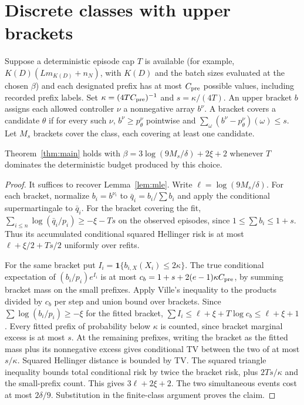\section{Discrete classes with upper brackets}\label{app:bracket}
Suppose a deterministic episode cap $T$ is available (for example, $K(D)(Lm_{K(D)}+n_N)$, with $K(D)$ and the batch sizes evaluated at the chosen $\beta$) and each designated prefix has at most $C_{\rm pre}$ possible values, including recorded prefix labels. Set $\kappa=(4TC_{\rm pre})^{-1}$ and $s=\kappa/(4T)$. An upper bracket $b$ assigns each allowed controller $\nu$ a nonnegative array $b^\nu$. A bracket covers a candidate $\theta$ if for every such $\nu$, $b^\nu\ge p_\theta^\nu$ pointwise and $\sum_\omega(b^\nu-p_\theta^\nu)(\omega)\le s$. Let $M_s$ brackets cover the class, each covering at least one candidate.

\begin{corollary}
Theorem~\ref{thm:main} holds with $\beta=3\log(9M_s/\delta)+2\xi+2$ whenever $T$ dominates the deterministic budget produced by this choice.
\end{corollary}
\begin{proof}
It suffices to recover Lemma~\ref{lem:mle}. Write $\ell=\log(9M_s/\delta)$. For each bracket, normalize $b_i=b^{\nu_i}$ to $\bar q_i=b_i/\sum b_i$ and apply the conditional supermartingale to $\bar q_i$. For the bracket covering the fit, $\sum_{i\le n}\log(\bar q_i/p_i)\ge-\xi-Ts$ on the observed episodes, since $1\le\sum b_i\le1+s$. Thus its accumulated conditional squared Hellinger risk is at most $\ell+\xi/2+Ts/2$ uniformly over refits.

For the same bracket put $I_i=\mathbf1\{b_{i,X}(X_i)\le2\kappa\}$. The true conditional expectation of $(b_i/p_i)e^{I_i}$ is at most $c_b=1+s+2(e-1)\kappa C_{\rm pre}$, by summing bracket mass on the small prefixes. Apply Ville's inequality to the products divided by $c_b$ per step and union bound over brackets. Since $\sum\log(b_i/p_i)\ge-\xi$ for the fitted bracket, $\sum I_i\le\ell+\xi+T\log c_b\le\ell+\xi+1$. Every fitted prefix of probability below $\kappa$ is counted, since bracket marginal excess is at most $s$. At the remaining prefixes, writing the bracket as the fitted mass plus its nonnegative excess gives conditional TV between the two of at most $s/\kappa$. Squared Hellinger distance is bounded by TV. The squared triangle inequality bounds total conditional risk by twice the bracket risk, plus $2Ts/\kappa$ and the small-prefix count. This gives $3\ell+2\xi+2$. The two simultaneous events cost at most $2\delta/9$. Substitution in the finite-class argument proves the claim.
\end{proof}

